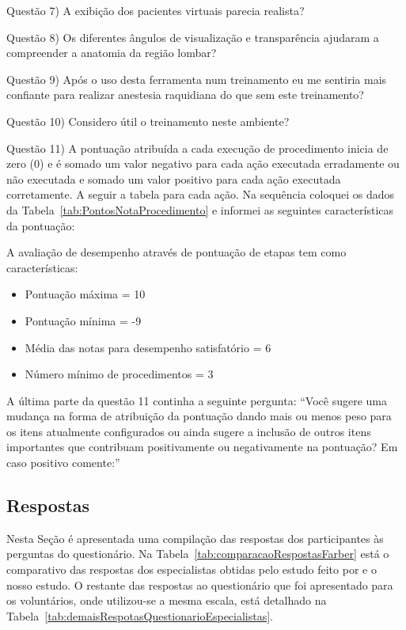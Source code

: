 Questão 7) A exibição dos pacientes virtuais parecia realista?

Questão 8) Os diferentes ângulos de visualização e transparência ajudaram a compreender a anatomia da região lombar?

Questão 9) Após o uso desta ferramenta num treinamento eu me sentiria mais confiante para realizar anestesia raquidiana do que sem este treinamento?

Questão 10) Considero útil o treinamento neste ambiente?

Questão 11) A pontuação atribuída a cada execução de procedimento inicia de zero (0) e é somado um valor negativo para cada ação executada erradamente ou não executada e somado um valor positivo para cada ação executada corretamente. A seguir a tabela para cada ação. Na sequência coloquei os dados da Tabela~\ref{tab:PontosNotaProcedimento} e informei as seguintes características da pontuação:

A avaliação de desempenho através de pontuação de etapas tem como características:
\begin{itemize}
   \item Pontuação máxima = 10
   \item Pontuação mínima = -9
   \item Média das notas para desempenho satisfatório = 6
   \item Número mínimo de procedimentos = 3
 \end{itemize}

A última parte da questão 11 continha a seguinte pergunta:
``Você sugere uma mudança na forma de atribuição da pontuação dando mais ou menos peso para os itens atualmente configurados ou ainda sugere a inclusão de outros itens importantes que contribuam positivamente ou negativamente na pontuação? Em caso positivo comente:''

\subsection{Respostas}
\label{sec:respostasEspecialistas}

Nesta Seção é apresentada uma compilação das respostas dos participantes às perguntas do questionário. Na Tabela~\ref{tab:comparacaoRespostasFarber} está o comparativo das respostas dos especialistas obtidas pelo estudo feito por \textcite{Farber2009} e o nosso estudo. O restante das respostas ao questionário que foi apresentado para os voluntários, onde utilizou-se a mesma escala, está detalhado na Tabela~\ref{tab:demaisRespotasQuestionarioEspecialistas}.

